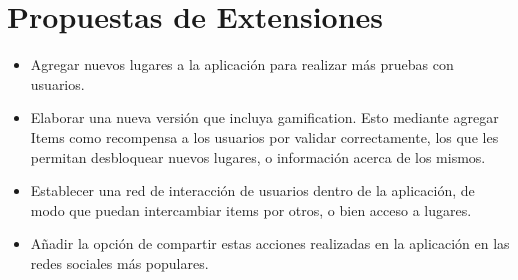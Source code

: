 \documentclass{sig-alternate}
\begin{document}
\section{Propuestas de Extensiones}

\begin{itemize}
 \item Agregar nuevos lugares a la aplicación para realizar más pruebas con usuarios.
  \item Elaborar una nueva versión que incluya gamification. Esto mediante agregar Items como recompensa a los usuarios por validar correctamente, los que les permitan desbloquear nuevos lugares, o información acerca de los mismos.
  \item Establecer una red de interacción de usuarios dentro de la aplicación, de modo que puedan intercambiar items por otros, o bien acceso a lugares.
  \item Añadir la opción de compartir estas acciones realizadas en la aplicación en las redes sociales más populares.
\end{itemize}
\end{document}
